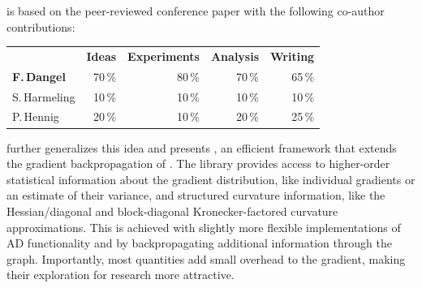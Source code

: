 \begin{disclaimer}
   is based on the peer-reviewed conference
  paper with the following co-author contributions:

   \cite{dangel2020modular}

  \vspace{-1.75ex}

  \begin{center}
    \begin{tabular}[!h]{lrrrr}
      & \textbf{Ideas} & \textbf{Experiments} & \textbf{Analysis} & \textbf{Writing}
      \\
      \textbf{F.\,Dangel} & 70\,\% & 80\,\% & 70\,\% & 65\,\%
      \\
      S.\,Harmeling & 10\,\%& 10\,\% & 10\,\% & 10\,\%
      \\
      P.\,Hennig & 20\,\% & 10\,\% & 20\,\% & 25\,\%
    \end{tabular}
  \end{center}
\end{disclaimer}

further generalizes this idea and presents \backpack, an efficient framework
that extends the gradient backpropagation of \pytorch. The library provides
access to higher-order statistical information about the gradient distribution,
like individual gradients or an estimate of their variance, and structured
curvature information, like the Hessian/\ggn diagonal and block-diagonal
Kronecker-factored curvature approximations. This is achieved with slightly more
flexible implementations of AD functionality and by backpropagating additional
information through the graph. Importantly, most quantities add small overhead
to the gradient, making their exploration for research more attractive.

